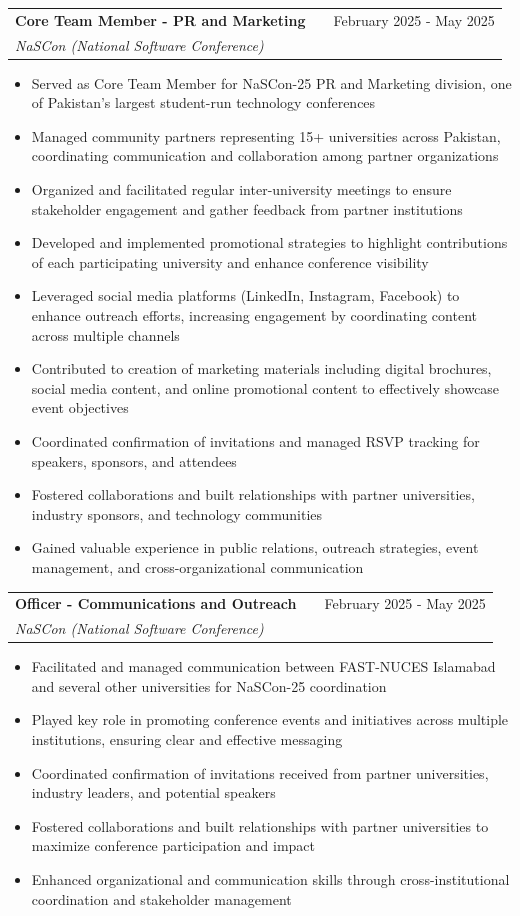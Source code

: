 \documentclass[a4paper,12pt]{article}
\makeatletter
\newenvironment{jobdetailed}[3]
    {
    \begin{tabularx}{\linewidth}{@{}l X r@{}}
    \textbf{#1} & \hfill & #2 \\
    \textit{#3} & & \\[3.75pt]
    \end{tabularx}
    \begin{minipage}[t]{\linewidth}
    \begin{itemize}[nosep,after=\strut, leftmargin=1em, itemsep=2pt,label=--]
    }
    {
    \end{itemize}
    \end{minipage}
    \vspace{6pt}
    }
\makeatother
\begin{document}
\begin{jobdetailed}{Core Team Member - PR and Marketing}{February 2025 - May 2025}{NaSCon (National Software Conference)}
\item Served as Core Team Member for NaSCon-25 PR and Marketing division, one of Pakistan's largest student-run technology conferences
\item Managed community partners representing 15+ universities across Pakistan, coordinating communication and collaboration among partner organizations
\item Organized and facilitated regular inter-university meetings to ensure stakeholder engagement and gather feedback from partner institutions
\item Developed and implemented promotional strategies to highlight contributions of each participating university and enhance conference visibility
\item Leveraged social media platforms (LinkedIn, Instagram, Facebook) to enhance outreach efforts, increasing engagement by coordinating content across multiple channels
\item Contributed to creation of marketing materials including digital brochures, social media content, and online promotional content to effectively showcase event objectives
\item Coordinated confirmation of invitations and managed RSVP tracking for speakers, sponsors, and attendees
\item Fostered collaborations and built relationships with partner universities, industry sponsors, and technology communities
\item Gained valuable experience in public relations, outreach strategies, event management, and cross-organizational communication
\end{jobdetailed}

\begin{jobdetailed}{Officer - Communications and Outreach}{February 2025 - May 2025}{NaSCon (National Software Conference)}
\item Facilitated and managed communication between FAST-NUCES Islamabad and several other universities for NaSCon-25 coordination
\item Played key role in promoting conference events and initiatives across multiple institutions, ensuring clear and effective messaging
\item Coordinated confirmation of invitations received from partner universities, industry leaders, and potential speakers
\item Fostered collaborations and built relationships with partner universities to maximize conference participation and impact
\item Enhanced organizational and communication skills through cross-institutional coordination and stakeholder management
\end{jobdetailed}
\end{document}
